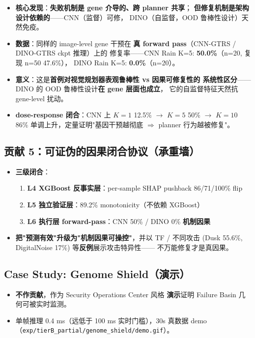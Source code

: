 \documentclass[a4paper,12pt,fontset=fandol]{ctexart}
\begin{document}
{\begin{itemize}
\item \textbf{核心发现}：\textbf{失败机制是 gene 介导的、跨 planner 共享}；
      \textbf{但修复机制是架构设计依赖的}——CNN（监督）可修，
      DINO（自监督，OOD 鲁棒性设计）天然免疫。
\item \textbf{数据}：同样的 image-level gene 干预在
      \textbf{真 forward pass}（CNN-GTRS / DINO-GTRS ckpt 推理）上的
      修复率——CNN Rain K=5: \textbf{50.0\%}（n=20, 复现 n=50 47.6\%），
      DINO Rain K=5: \textbf{0.0\%}（n=20）。
\item \textbf{意义}：这是\textbf{首例对视觉规划器表观鲁棒性 vs 因果可修复性的
      系统性区分}——DINO 的 OOD 鲁棒性设计\textbf{在 gene 层面也成立}，
      它的自监督特征天然抗 gene-level 扰动。
\item \textbf{dose-response 闭合}：CNN 上 $K=1$ 12.5\% $\to$ $K=5$ 50\% $\to$ $K=10$ 86\%
      单调上升，定量证明"基因干预越彻底 $\Rightarrow$ planner 行为越被修复"。
\end{itemize}

\subsection{贡献 5：可证伪的因果闭合协议（\textbf{承重墙}）}

\begin{itemize}
\item \textbf{三级闭合}：
      \begin{enumerate}
      \item \textbf{L4 XGBoost 反事实层}：per-sample SHAP pushback 86/71/100\% flip
      \item \textbf{L5 独立验证层}：89.2\% monotonicity（不依赖 XGBoost）
      \item \textbf{L6 执行层 forward-pass}：CNN 50\% / DINO 0\% \textbf{机制因果}
      \end{enumerate}
\item \textbf{把"预测有效"升级为"机制因果可操控"}，并以 TF / 不同攻击
      (Dusk 55.6\%, DigitalNoise 17\%) 等\textbf{反例}展示攻击特异性——
      不万能修复才是真因果。
\end{itemize}

\subsection{Case Study: Genome Shield（演示）}

\begin{itemize}
\item \textbf{不作贡献}，作为 Security Operations Center 风格
      \textbf{演示}证明 Failure Basin 几何可被实时监测。
\item 单帧推理 0.4 ms（远低于 100 ms 实时门槛），30s 真数据 demo
      （\texttt{exp/tierB\_partial/genome\_shield/demo.gif}）。
\end{itemize}

}
\end{document}
